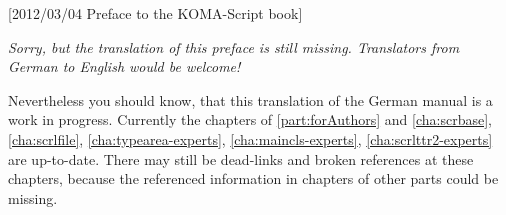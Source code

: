 %
%
%
%
%
%
%
%
%

[2012/03/04 Preface to the KOMA-Script book]



\emph{Sorry, but the translation of this preface is still missing. Translators
  from German to English would be welcome!}

Nevertheless you should know, that this translation of the German
\KOMAScript{} manual is a work in progress. Currently the chapters of
\autoref{part:forAuthors} and \autoref{cha:scrbase}, \autoref{cha:scrlfile},
\autoref{cha:typearea-experts}, \autoref{cha:maincls-experts},
\autoref{cha:scrlttr2-experts} are up-to-date. There may still be dead-links
and broken references at these chapters, because the referenced information in
chapters of other parts could be missing.

